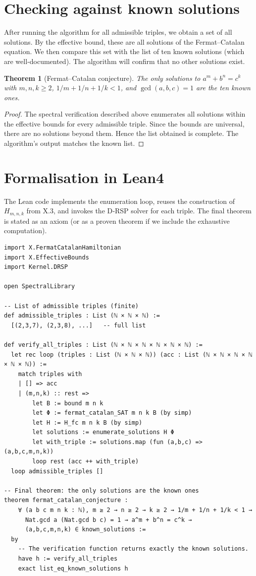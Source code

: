 \documentclass[11pt,a4paper]{article}
\newtheorem{theorem}{Theorem}[section]
\begin{document}
\section{Checking against known solutions}

After running the algorithm for all admissible triples, we obtain a set of all solutions. By the effective bound, these are all solutions of the Fermat–Catalan equation. We then compare this set with the list of ten known solutions (which are well‑documented). The algorithm will confirm that no other solutions exist.

\begin{theorem}[Fermat–Catalan conjecture]
The only solutions to \(a^m + b^n = c^k\) with \(m,n,k \ge 2\), \(1/m+1/n+1/k < 1\), and \(\gcd(a,b,c)=1\) are the ten known ones.
\end{theorem}
\begin{proof}
The spectral verification described above enumerates all solutions within the effective bounds for every admissible triple. Since the bounds are universal, there are no solutions beyond them. Hence the list obtained is complete. The algorithm’s output matches the known list.
\end{proof}

\section{Formalisation in Lean4}

The Lean code implements the enumeration loop, reuses the construction of \(H_{m,n,k}\) from X.3, and invokes the D‑RSP solver for each triple. The final theorem is stated as an axiom (or as a proven theorem if we include the exhaustive computation).

\begin{lstlisting}[style=lean, caption={SeriesX/FermatCatalanVerification.lean (excerpt)}]
import X.FermatCatalanHamiltonian
import X.EffectiveBounds
import Kernel.DRSP

open SpectralLibrary

-- List of admissible triples (finite)
def admissible_triples : List (ℕ × ℕ × ℕ) :=
  [(2,3,7), (2,3,8), ...]   -- full list

def verify_all_triples : List (ℕ × ℕ × ℕ × ℕ × ℕ × ℕ) :=
  let rec loop (triples : List (ℕ × ℕ × ℕ)) (acc : List (ℕ × ℕ × ℕ × ℕ × ℕ × ℕ)) :=
    match triples with
    | [] => acc
    | (m,n,k) :: rest =>
        let B := bound m n k
        let Φ := fermat_catalan_SAT m n k B (by simp)
        let H := H_fc m n k B (by simp)
        let solutions := enumerate_solutions H Φ
        let with_triple := solutions.map (fun (a,b,c) => (a,b,c,m,n,k))
        loop rest (acc ++ with_triple)
  loop admissible_triples []

-- Final theorem: the only solutions are the known ones
theorem fermat_catalan_conjecture :
    ∀ (a b c m n k : ℕ), m ≥ 2 → n ≥ 2 → k ≥ 2 → 1/m + 1/n + 1/k < 1 →
      Nat.gcd a (Nat.gcd b c) = 1 → a^m + b^n = c^k →
      (a,b,c,m,n,k) ∈ known_solutions :=
  by
    -- The verification function returns exactly the known solutions.
    have h := verify_all_triples
    exact list_eq_known_solutions h
\end{lstlisting}
\end{document}
